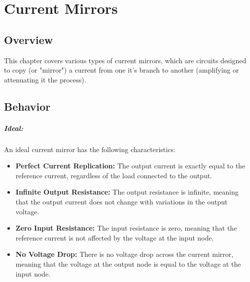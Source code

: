 \chapter{Current Mirrors}
\label{ch:Current_Mirrors}

\section{Overview}
This chapter covers various types of current mirrors,
which are circuits designed to copy (or "mirror") a current
from one it's branch to another (amplifying or attenuating
it the process).

\section{Behavior}
\paragraph{Ideal:}
An ideal current mirror has the following characteristics:
\begin{itemize}
  \item \textbf{Perfect Current Replication:} The output
    current is exactly equal to the reference current,
    regardless of the load connected to the output.
  \item \textbf{Infinite Output Resistance:} The output
    resistance is infinite, meaning that the output current
    does not change with variations in the output voltage.
  \item \textbf{Zero Input Resistance:} The input resistance
    is zero, meaning that the reference current is not
    affected by the voltage at the input node.
  \item \textbf{No Voltage Drop:} There is no voltage drop
    across the current mirror, meaning that the voltage at
    the output node is equal to the voltage at the input
    node.
\end{itemize}
